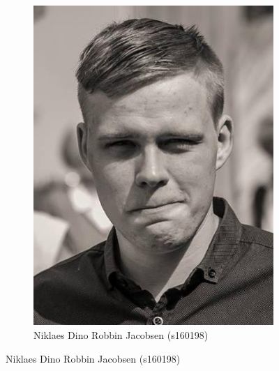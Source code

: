 \begin{figure}[H]
\begin{subfigure}{0.25\textwidth}
		\includegraphics[width=\linewidth]{graphics/members/niklaes}
		\caption*{Niklaes Dino Robbin Jacobsen (s160198)}
	\end{subfigure}

	\medskip
	\vspace{1cm}


\end{figure}
